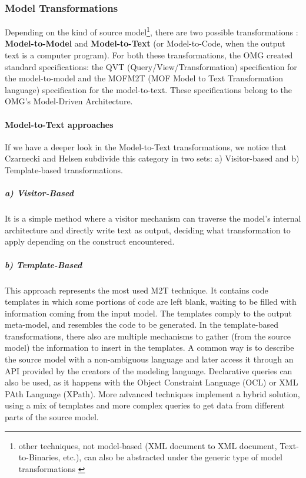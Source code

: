 \subsubsection{Model Transformations}
\label{m2m&m2t}
Depending on the kind of source model\footnote{other techniques, not model-based (XML document to XML document, Text-to-Binaries, etc.), can also be abstracted under the generic type of model transformations \cite{M2TandM2M}}, there are two possible transformations \cite{Papa11}: \textbf{Model-to-Model} and \textbf{Model-to-Text} (or Model-to-Code, when the output text is a computer program). 
For both these transformations, the OMG created standard specifications: the QVT (Query/View/Transformation) specification for the model-to-model and the MOFM2T (MOF Model to Text Transformation language) specification for the model-to-text. These specifications belong to the OMG's Model-Driven Architecture.

\paragraph{Model-to-Text approaches}
If we have a deeper look in the Model-to-Text transformations, we notice that Czarnecki and Helsen \cite{Czarnecki03classificationof} subdivide this category in two sets: a) Visitor-based and b) Template-based transformations.
\subparagraph{a) Visitor-Based}
It is a simple method where a visitor mechanism can traverse the model's internal architecture and directly write text as output, deciding what transformation to apply depending on the construct encountered. 
\subparagraph{b) Template-Based}
This approach represents the most used M2T technique. It contains code templates in which some portions of code are left blank, waiting to be filled with information coming from the input model. 
The templates comply to the output meta-model, and resembles the code to be generated. 
In the template-based transformations, there also are multiple mechanisms to gather (from the source model) the information  to insert in the templates. A common way is to describe the source model with a non-ambiguous language and later access it through an API provided by the creators of the modeling language. Declarative queries can also be used, as it happens with the Object Constraint Language (OCL) or XML PAth Language (XPath). 
More advanced techniques implement a hybrid solution, using a mix of templates and more complex queries to get data from different parts of the source model.  

